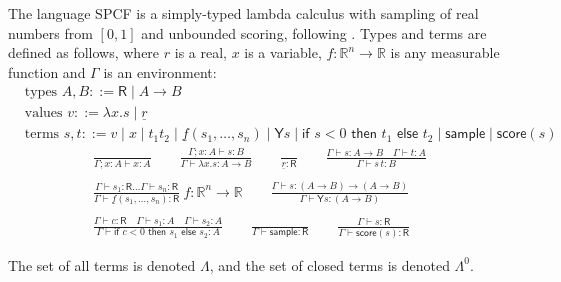 \documentclass{article}
\newcommand{\tY}{\textsf{Y}}
\newcommand{\tif}[3]{\textsf{if }#1\textsf{ then }#2\textsf{ else }#3}
\newcommand{\tsample}{\textsf{sample}}
\newcommand{\tscore}{\textsf{score}}
\theoremstyle{definition}
\theoremstyle{lemma}
\theoremstyle{remark}
\begin{document}
The language SPCF is a simply-typed lambda calculus with sampling of real numbers from $[0,1]$ and unbounded scoring, following \cite{MakOP20b}. Types and terms are defined as follows, where $r$ is a real, $x$ is a variable, $f : \mathbb{R}^n \to \mathbb{R}$ is any measurable function and $\Gamma$ is an environment:
\begin{align*}
  & \text{types } A, B ::= \textsf{R}  \mid  A \to B \\
  & \text{values } v ::= \lambda x.s  \mid  \underline{r} \\
  & \text{terms } s, t ::= v  \mid  x  \mid  t_1 t_2  \mid  \underline{f}(s_1,\dots ,s_n)  \mid  \tY s  \mid  \tif{s < 0}{t_1}{t_2}  \mid  \tsample  \mid  \tscore(s)
\end{align*}
\begin{align*}
  \frac{}{\Gamma ; x:A \vdash x:A} \qquad
  \frac{\Gamma ; x:A \vdash s : B}{\Gamma \vdash \lambda x.s : A \to B} \qquad
  \frac{}{\underline{r} : \textsf{R}} \qquad
  \frac{\Gamma \vdash s:A \to B \quad \Gamma \vdash t : A}{\Gamma \vdash s \, t : B} \\ \\
  \frac{\Gamma \vdash s_1:\textsf{R} \dots \Gamma \vdash s_n:\textsf{R}}{\Gamma \vdash \underline{f}(s_1,\dots,s_n) : \textsf{R}} \ f : \mathbb{R}^n \to \mathbb{R} \qquad
  \frac{\Gamma \vdash s : (A \to B) \to (A \to B)}{\Gamma \vdash \tY s : (A \to B)} \\ \\
  \frac{\Gamma \vdash c : \textsf{R} \quad \Gamma \vdash s_1 : A \quad \Gamma \vdash s_2 : A}{\Gamma \vdash \tif{c < 0}{s_1}{s_2} : A} \qquad
  \frac{}{\Gamma \vdash \tsample : \textsf{R}} \qquad
  \frac{\Gamma \vdash s : \textsf{R}}{\Gamma \vdash \tscore (s) : \textsf{R}}
\end{align*}

The set of all terms is denoted $\Lambda$, and the set of closed terms is denoted $\Lambda^0$.
\end{document}
